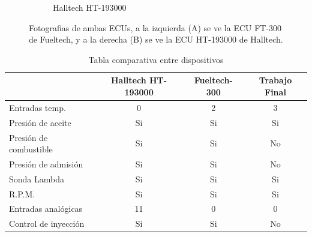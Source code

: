 \begin{figure}[htpb]
\begin{subfigure}{.5\textwidth}
\caption{Halltech HT-193000}
\label{fig:halltech}
\end{subfigure}
\hfill
\caption{Fotografias de ambas ECUs, a la izquierda (A) se ve la ECU FT-300 de Fueltech, y a la derecha (B) se ve la ECU HT-193000 de Halltech.}
\label{fig:comparativa}
\end{figure}

\vspace{25px}

\begin{table}[h]
	\centering
	\caption[caption corto]{Tabla comparativa entre dispositivos}
	\begin{tabular}{l c c c}    
		\toprule
		\textbf{ }     & \textbf{Halltech HT-193000} & \textbf{Fueltech-300} & \textbf{Trabajo Final}\\
		\midrule
		Entradas temp.			&  0 &   2 &  3\\
		Presión de aceite		& Si &  Si & Si\\
		Presión de combustible	& Si &  Si & No\\
		Presión de admisión		& Si &  Si & No\\
		Sonda Lambda			& Si &  Si & Si\\
		R.P.M.					& Si &  Si & Si\\
		Entradas analógicas		& 11 &  0  &  0\\
		Control de inyección	& Si &  Si & No\\
		\bottomrule
		\hline
	\end{tabular}
	\label{tab:comparativa}
\end{table}


